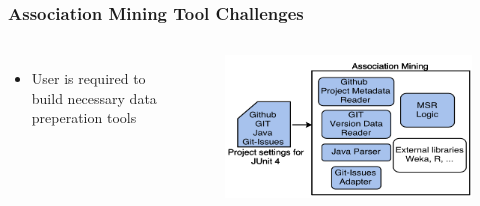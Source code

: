         \begin{frame}
            \frametitle{Association Mining Tool Challenges}
            \begin{columns}
                \begin{itemize}
                    \item User is required to build necessary data preperation tools
                 \end{itemize}
                 \begin{figure}
                    \centering
                        \includegraphics[width=0.85\linewidth]{figures/association.png}
                 \end{figure}
             \end{columns}
        \end{frame}

